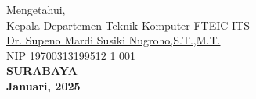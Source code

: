 \vspace{\fill}

\begin{center}
  Mengetahui,\\
  Kepala Departemen Teknik Komputer FTEIC-ITS\\
  \vspace{10ex}
  \underline{Dr. Supeno Mardi Susiki Nugroho,S.T.,M.T. }\\
  NIP 19700313199512 1 001\\
  \vspace{10ex}
  \textbf{SURABAYA} \\
  \textbf{Januari, 2025}
\end{center}
\endgroup
